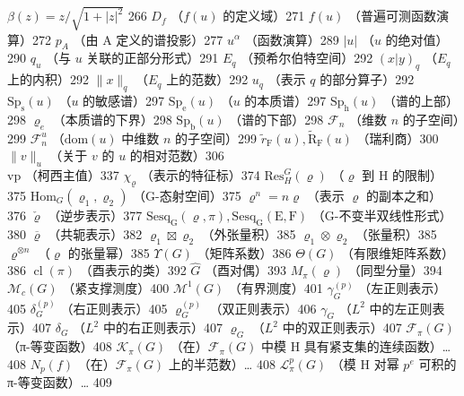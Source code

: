 \(\beta (z) = z / \sqrt{1 + |z|^2}\) 266 \(D_f\) （\(f(u)\) 的定义域）271 \(f(u)\) （普遍可测函数演算）272 \(p_A\) （由 A 定义的谱投影）277 \(u^\alpha\) （函数演算）289 \(|u|\) （\(u\) 的绝对值）290 \(q_u\) （与 \(u\) 关联的正部分形式）291 \(E_q\) （预希尔伯特空间）292 \((x|y)_q\) （\(E_q\) 上的内积）292 \(\| x \| _q\) （\(E_q\) 上的范数）292 \(u_q\) （表示 \(q\) 的部分算子）292 \(\mathrm{Sp}_{\mathrm{s}}(u)\) （\(u\) 的敏感谱）297 \(\mathrm{Sp}_{\mathrm{e}}(u)\) （\(u\) 的本质谱）297 \(\mathrm{Sp_h}(u)\) （谱的上部）298 \(\varrho_{e}\) （本质谱的下界）298 \(\mathrm{Sp_b}(u)\) （谱的下部）298 \(\mathcal{F}_n\) （维数 \(n\) 的子空间）299 \(\mathcal{F}_n^u\) （\(\mathrm{dom}(u)\) 中维数 \(n\) 的子空间）299 \(\widetilde{r}_{\mathrm{F}}(u), \widetilde{\mathrm{R}}_{\mathrm{F}}(u)\) （瑞利商）300 \(\|v\|_u\) （关于 \(v\) 的 \(u\) 的相对范数）306\\
vp （柯西主值）337 \(\chi_\varrho\) （表示的特征标）374 \(\mathrm{Res}_{H}^{G}(\varrho)\) （\(\varrho\) 到 H 的限制）375 \(\mathrm{Hom}_{G}(\varrho_1,\varrho_2)\) （G-态射空间）375 \(\varrho^n = n \varrho\) （表示 \(\varrho\) 的副本之和）376 \(\check{\varrho}\) （逆步表示）377 \(\mathrm{Sesq_G}(\varrho, \pi), \mathrm{Sesq_G(E,F)}\) （G-不变半双线性形式）380 \(\overline{\varrho}\) （共轭表示）382 \(\varrho_1 \boxtimes \varrho_2\) （外张量积）385 \(\varrho_1 \otimes \varrho_2\) （张量积）385 \(\varrho^{\otimes n}\) （\(\varrho\) 的张量幂）385 \(\Upsilon(G)\) （矩阵系数）386 \(\Theta(G)\) （有限维矩阵系数）386 \(\operatorname{cl}(\pi)\) （酉表示的类）392 \(\widehat{G}\) （酉对偶）393 \(M_\pi (\varrho)\) （同型分量）394 \(\mathcal{M}_c(G)\) （紧支撑测度）400 \(\mathcal{M}^1(G)\) （有界测度）401 \(\gamma_{G}^{(p)}\) （左正则表示）405 \(\delta_{G}^{(p)}\) （右正则表示）405 \(\varrho_{G}^{(p)}\) （双正则表示）406 \(\gamma_{G}\) （\(L^2\) 中的左正则表示）407 \(\delta_{G}\) （\(L^2\) 中的右正则表示）407 \(\varrho_{G}\) （\(L^2\) 中的双正则表示）407 \(\mathcal{F}_{\pi}(G)\) （π-等变函数）408 \(\mathcal{K}_{\pi}(G)\) （在）\(\mathcal{F}_{\pi}(G)\) 中模 H 具有紧支集的连续函数）\ldots{} 408 \(N_p(f)\) （在）\(\mathcal{F}_π(G)\) 上的半范数）\ldots{} 408 \(\mathcal{L}_{\pi}^{p}(G)\) （模 H 对幂 \(p^e\) 可积的 π-等变函数）\ldots{} 409

